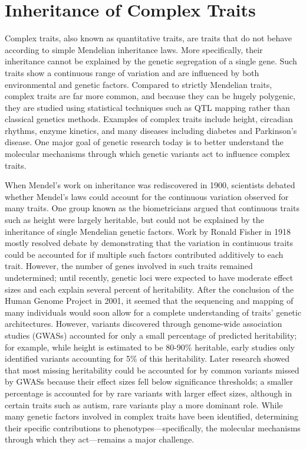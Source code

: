 \chapter{Inheritance of Complex Traits}\label{inheritance-of-complex-traits}

Complex traits, also known as quantitative traits, are traits that do not behave according to simple Mendelian inheritance laws. More specifically, their inheritance cannot be explained by the genetic segregation of a single gene. Such traits show a continuous range of variation and are influenced by both environmental and genetic factors. Compared to strictly Mendelian traits, complex traits are far more common, and because they can be hugely polygenic, they are studied using statistical techniques such as QTL mapping rather than classical genetics methods. Examples of complex traits include height, circadian rhythms, enzyme kinetics, and many diseases including diabetes and Parkinson's disease. One major goal of genetic research today is to better understand the molecular mechanisms through which genetic variants act to influence complex traits.

When Mendel's work on inheritance was rediscovered in 1900, scientists debated whether Mendel's laws could account for the continuous variation observed for many traits. One group known as the biometricians argued that continuous traits such as height were largely heritable, but could not be explained by the inheritance of single Mendelian genetic factors. Work by Ronald Fisher in 1918 mostly resolved debate by demonstrating that the variation in continuous traits could be accounted for if multiple such factors contributed additively to each trait. However, the number of genes involved in such traits remained undetermined; until recently, genetic loci were expected to have moderate effect sizes and each explain several percent of heritability. After the conclusion of the Human Genome Project in 2001, it seemed that the sequencing and mapping of many individuals would soon allow for a complete understanding of traits' genetic architectures. However, variants discovered through genome-wide association studies (GWASs) accounted for only a small percentage of predicted heritability; for example, while height is estimated to be 80-90\% heritable, early studies only identified variants accounting for 5\% of this heritability. Later research showed that most missing heritability could be accounted for by common variants missed by GWASs because their effect sizes fell below significance thresholds; a smaller percentage is accounted for by rare variants with larger effect sizes, although in certain traits such as autism, rare variants play a more dominant role. While many genetic factors involved in complex traits have been identified, determining their specific contributions to phenotypes---specifically, the molecular mechanisms through which they act---remains a major challenge.

